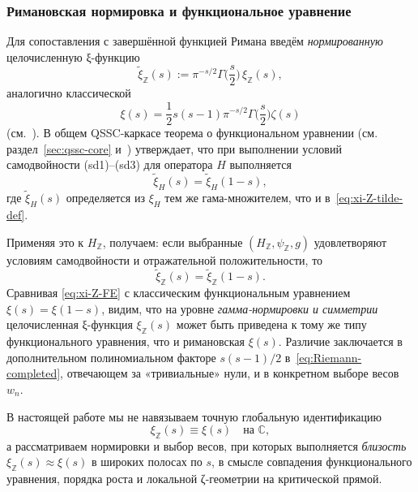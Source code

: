 \documentclass{article}
\numberwithin{equation}{section}
\theoremstyle{plain}
\theoremstyle{definition}
\theoremstyle{remark}
\begin{document}
\subsubsection{Римановская нормировка и функциональное уравнение}
\label{subsubsec:completed-xi-Z}

\noindent
Для сопоставления с завершённой функцией Римана введём
\emph{нормированную} целочисленную ξ-функцию
\begin{equation}
\label{eq:xi-Z-tilde-def}
\widetilde{\xi}_{\mathbb Z}(s)
:=
\pi^{-s/2}\Gamma\!\Big(\frac s2\Big)\,\xi_{\mathbb Z}(s),
\end{equation}
аналогично классической
\begin{equation}
\label{eq:Riemann-completed}
\xi(s)
=
\frac{1}{2}s(s-1)\pi^{-s/2}\Gamma\!\Big(\frac s2\Big)\zeta(s)
\end{equation}
(см.~\cite{Edwards1974,IwaniecKowalski2004}). В общем QSSC-каркасе
теорема о функциональном уравнении
(см. раздел~\ref{sec:qssc-core} и~\cite{Monakhov-QSG-002})
утверждает, что при выполнении условий самодвойности (sd1)–(sd3)
для оператора $H$ выполняется
\begin{equation}
\label{eq:xi-H-FE}
\widetilde{\xi}_H(s)=\widetilde{\xi}_H(1-s),
\end{equation}
где $\widetilde{\xi}_H(s)$ определяется из $\xi_H$ тем же
гама-множителем, что и в~\eqref{eq:xi-Z-tilde-def}.

Применяя это к $H_{\mathbb Z}$, получаем: если выбранные
$(H_{\mathbb Z},\psi_{\mathbb Z},g)$ удовлетворяют условиям
самодвойности и отражательной положительности, то
\begin{equation}
\label{eq:xi-Z-FE}
\widetilde{\xi}_{\mathbb Z}(s)=\widetilde{\xi}_{\mathbb Z}(1-s).
\end{equation}
Сравнивая \eqref{eq:xi-Z-FE} с классическим функциональным
уравнением $\xi(s)=\xi(1-s)$, видим, что на уровне
\emph{гамма-нормировки и симметрии} целочисленная ξ-функция
$\xi_{\mathbb Z}(s)$ может быть приведена к тому же типу
функционального уравнения, что и римановская $\xi(s)$.
Различие заключается в дополнительном полиномиальном факторе
$s(s-1)/2$ в~\eqref{eq:Riemann-completed}, отвечающем за
«тривиальные» нули, и в конкретном выборе весов $w_n$.

В настоящей работе мы не навязываем точную глобальную идентификацию
\[
\xi_{\mathbb Z}(s)\equiv\xi(s)
\quad\text{на }\mathbb C,
\]
а рассматриваем нормировки и выбор весов, при которых выполняется
\emph{близость} $\xi_{\mathbb Z}(s)\approx\xi(s)$ в широких полосах
по $s$, в смысле совпадения функционального уравнения, порядка роста
и локальной ζ-геометрии на критической прямой.
\end{document}
